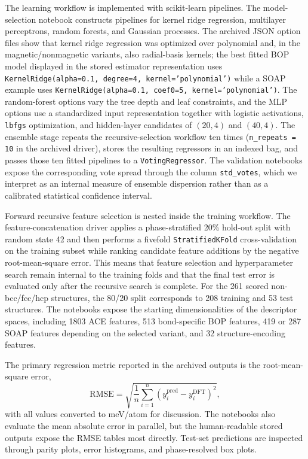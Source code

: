 The learning workflow is implemented with scikit-learn pipelines.\cite{Pedregosa2011} The model-selection notebook constructs pipelines for kernel ridge regression, multilayer perceptrons, random forests, and Gaussian processes. The archived JSON option files show that kernel ridge regression was optimized over polynomial and, in the magnetic/nonmagnetic variants, also radial-basis kernels; the best fitted BOP model displayed in the stored estimator representation uses \texttt{KernelRidge(}\allowbreak\texttt{alpha=0.1, degree=4, kernel='polynomial')} while a SOAP example uses \texttt{KernelRidge(}\allowbreak\texttt{alpha=0.1, coef0=5, kernel='polynomial')}. The random-forest options vary the tree depth and leaf constraints, and the MLP options use a standardized input representation together with logistic activations, \texttt{lbfgs} optimization, and hidden-layer candidates of $(20,4)$ and $(40,4)$. The ensemble stage repeats the recursive-selection workflow ten times (\texttt{n\_repeats = 10} in the archived driver), stores the resulting regressors in an indexed bag, and passes those ten fitted pipelines to a \texttt{VotingRegressor}. The validation notebooks expose the corresponding vote spread through the column \texttt{std\_votes}, which we interpret as an internal measure of ensemble dispersion rather than as a calibrated statistical confidence interval.

Forward recursive feature selection is nested inside the training workflow. The feature-concatenation driver applies a phase-stratified 20\% hold-out split with random state 42 and then performs a fivefold \texttt{StratifiedKFold} cross-validation on the training subset while ranking candidate feature additions by the negative root-mean-square error. This means that feature selection and hyperparameter search remain internal to the training folds and that the final test error is evaluated only after the recursive search is complete. For the 261 scored non-bcc/fcc/hcp structures, the 80/20 split corresponds to 208 training and 53 test structures. The notebooks expose the starting dimensionalities of the descriptor spaces, including 1803 ACE features, 513 bond-specific BOP features, 419 or 287 SOAP features depending on the selected variant, and 32 structure-encoding features.

The primary regression metric reported in the archived outputs is the root-mean-square error,
\begin{equation}
\mathrm{RMSE}=\sqrt{\frac{1}{n}\sum_{i=1}^{n}\left(y_i^{\mathrm{pred}}-y_i^{\mathrm{DFT}}\right)^2},
\label{eq:rmse}
\end{equation}
with all values converted to meV/atom for discussion. The notebooks also evaluate the mean absolute error in parallel, but the human-readable stored outputs expose the RMSE tables most directly. Test-set predictions are inspected through parity plots, error histograms, and phase-resolved box plots.

